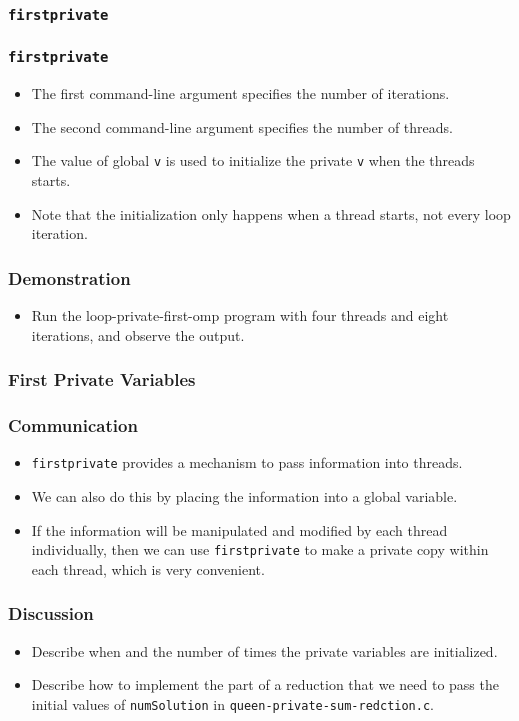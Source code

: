 \documentclass{beamer}
\begin{document}
\begin{frame}
\frametitle{\tt firstprivate} 
\end{frame}

\begin{frame}
\frametitle{\tt firstprivate}
\begin{itemize}
\item The first command-line argument specifies the number of iterations.
\item The second command-line argument specifies the number of threads.
\item The value of global {\tt v} is used to initialize the private
  {\tt v} when the threads starts.
\item Note that the initialization only happens when a thread starts,
  not every loop iteration.
\end{itemize}
\end{frame}

\begin{frame}
\frametitle{Demonstration}
\begin{itemize}
\item Run the loop-private-first-omp program with four threads and
  eight iterations, and observe the output.
\end{itemize}
\end{frame}

\begin{frame}
\frametitle{First Private Variables}
\centerline{}
\end{frame}

\begin{frame}
\frametitle{Communication}
\begin{itemize}
\item {\tt firstprivate} provides a mechanism to pass information
  into threads.
\item We can also do this by placing the information into a global
  variable.  
\item If the information will be manipulated and modified by each thread individually, then we can use {\tt firstprivate} to make a private copy within each thread, which is very convenient.
\end{itemize}
\end{frame}

\begin{frame}
\frametitle{Discussion}
\begin{itemize}
\item Describe when and the number of times the private variables are
  initialized.
\item Describe how to implement the part of a reduction that we need
  to pass the initial values of {\tt numSolution} in {\tt queen-private-sum-redction.c}.
\end{itemize}
\end{frame}
\end{document}
